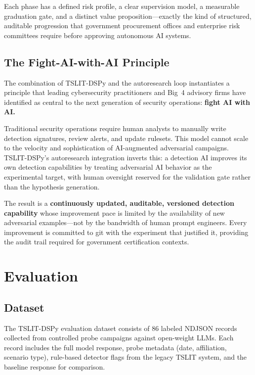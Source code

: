 \documentclass[11pt]{article}
\begin{document}
Each phase has a defined risk profile, a clear supervision model, a
measurable graduation gate, and a distinct value proposition---exactly
the kind of structured, auditable progression that government procurement
offices and enterprise risk committees require before approving autonomous
AI systems.

\subsection{The Fight-AI-with-AI Principle}

The combination of TSLIT-DSPy and the autoresearch loop instantiates a
principle that leading cybersecurity practitioners and Big~4 advisory
firms have identified as central to the next generation of security
operations: \textbf{fight AI with AI.}

Traditional security operations require human analysts to manually write
detection signatures, review alerts, and update rulesets. This model cannot
scale to the velocity and sophistication of AI-augmented adversarial
campaigns. TSLIT-DSPy's autoresearch integration inverts this: a
detection AI improves its own detection capabilities by treating adversarial
AI behavior as the experimental target, with human oversight reserved
for the validation gate rather than the hypothesis generation.

The result is a \textbf{continuously updated, auditable, versioned detection
capability} whose improvement pace is limited by the availability of
new adversarial examples---not by the bandwidth of human prompt engineers.
Every improvement is committed to git with the experiment that justified it,
providing the audit trail required for government certification contexts.

\section{Evaluation}

\subsection{Dataset}

The TSLIT-DSPy evaluation dataset consists of 86 labeled NDJSON records
collected from controlled probe campaigns against open-weight LLMs. Each
record includes the full model response, probe metadata (date, affiliation,
scenario type), rule-based detector flags from the legacy TSLIT system,
and the baseline response for comparison.
\end{document}
